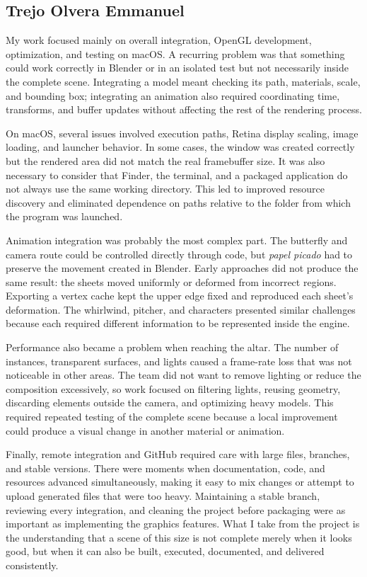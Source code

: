 \documentclass[letter,12pt]{article}
\begin{document}
	\subsection*{Trejo Olvera Emmanuel}
	My work focused mainly on overall integration, OpenGL development, optimization, and testing on macOS. A recurring problem was that something could work correctly in Blender or in an isolated test but not necessarily inside the complete scene. Integrating a model meant checking its path, materials, scale, and bounding box; integrating an animation also required coordinating time, transforms, and buffer updates without affecting the rest of the rendering process.

	On macOS, several issues involved execution paths, Retina display scaling, image loading, and launcher behavior. In some cases, the window was created correctly but the rendered area did not match the real framebuffer size. It was also necessary to consider that Finder, the terminal, and a packaged application do not always use the same working directory. This led to improved resource discovery and eliminated dependence on paths relative to the folder from which the program was launched.

	Animation integration was probably the most complex part. The butterfly and camera route could be controlled directly through code, but \textit{papel picado} had to preserve the movement created in Blender. Early approaches did not produce the same result: the sheets moved uniformly or deformed from incorrect regions. Exporting a vertex cache kept the upper edge fixed and reproduced each sheet's deformation. The whirlwind, pitcher, and characters presented similar challenges because each required different information to be represented inside the engine.

	Performance also became a problem when reaching the altar. The number of instances, transparent surfaces, and lights caused a frame-rate loss that was not noticeable in other areas. The team did not want to remove lighting or reduce the composition excessively, so work focused on filtering lights, reusing geometry, discarding elements outside the camera, and optimizing heavy models. This required repeated testing of the complete scene because a local improvement could produce a visual change in another material or animation.

	Finally, remote integration and GitHub required care with large files, branches, and stable versions. There were moments when documentation, code, and resources advanced simultaneously, making it easy to mix changes or attempt to upload generated files that were too heavy. Maintaining a stable branch, reviewing every integration, and cleaning the project before packaging were as important as implementing the graphics features. What I take from the project is the understanding that a scene of this size is not complete merely when it looks good, but when it can also be built, executed, documented, and delivered consistently.
\end{document}
